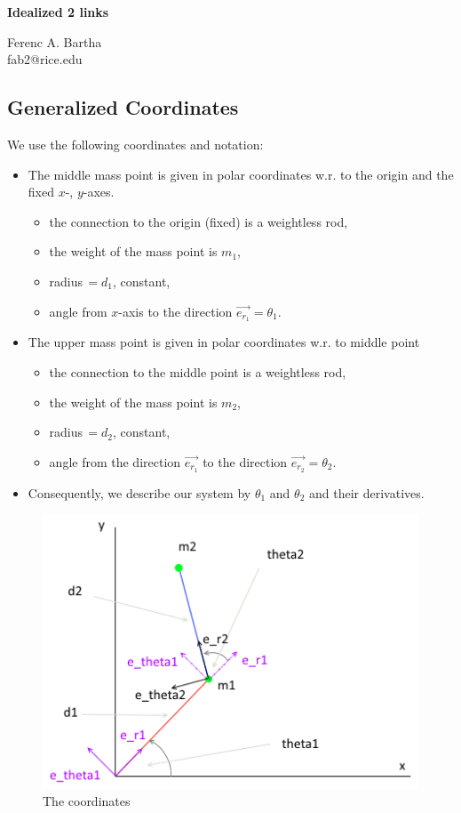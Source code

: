 \documentclass[12pt]{article}
\renewcommand{\vec}[1]{\ensuremath{\overrightarrow{#1}}}
\begin{document}
\begin{center}
{\huge \bf Idealized 2 links} \\
\end{center}
\vspace{1ex}
\begin{flushright}
Ferenc A. Bartha\\
fab2@rice.edu
\end{flushright}

\subsection*{Generalized Coordinates}
We use the following coordinates and notation:
\begin{itemize}
 \item The middle mass point is given in polar coordinates w.r. to the origin and the fixed $x$-, $y$-axes.
 \begin{itemize}
  \item the connection to the origin (fixed) is a weightless rod,
  \item the weight of the mass point is $m_1$,
  \item radius$\, = d_1$, constant,
  \item angle from $x$-axis to the direction $\vec{e_{r_1}} = \theta_1$.
 \end{itemize}
 \item The upper mass point is given in polar coordinates w.r. to middle point
 \begin{itemize}
  \item the connection to the middle point is a weightless rod,
  \item the weight of the mass point is $m_2$,
  \item radius$\, = d_2$, constant,
  \item angle from the direction $\vec{e_{r_1}}$ to the direction $\vec{e_{r_2}} = \theta_2$.
 \end{itemize}
 \item Consequently, we describe our system by $\theta_1$ and $\theta_2$ and their derivatives.
\end{itemize}

\begin{figure}[!ht]
	\centering
	\includegraphics[scale=0.8]{01_Idealized_2links.png}
    \caption{The coordinates}
\end{figure}
\end{document}
